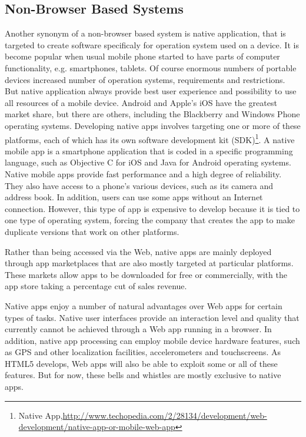 \subsection{Non-Browser Based Systems}
Another synonym of a non-browser based system is native application, that is targeted to create software specificaly for operation system used on a device. It is become popular when usual mobile phone started to have parts of computer functionality, e.g. smartphones, tablets. Of course enormous numbers of portable devices increased number of operation systems, requirements and restrictions. But native application always provide best user experience and possibility to use all resources of a mobile device. Android and Apple's iOS have the greatest market share, but there are others, including the Blackberry and Windows Phone operating systems. Developing native apps involves targeting one or more of these platforms, each of which has its own software development kit (SDK)\footnote{Native App,\url{http://www.techopedia.com/2/28134/development/web-development/native-app-or-mobile-web-app}}. A native mobile app is a smartphone application that is coded in a specific programming language, such as Objective C for iOS and Java for Android operating systems. Native mobile apps provide fast performance and a high degree of reliability. They also have access to a phone's various devices, such as its camera and address book. In addition, users can use some apps without an Internet connection. However, this type of app is expensive to develop because it is tied to one type of operating system, forcing the company that creates the app to make duplicate versions that work on other platforms.

Rather than being accessed via the Web, native apps are mainly deployed through app marketplaces that are also mostly targeted at particular platforms. These markets allow apps to be downloaded for free or commercially, with the app store taking a percentage cut of sales revenue.

Native apps enjoy a number of natural advantages over Web apps for certain types of tasks. Native user interfaces provide an interaction level and quality that currently cannot be achieved through a Web app running in a browser. In addition, native app processing can employ mobile device hardware features, such as GPS and other localization facilities, accelerometers and touchscreens. As HTML5 develops, Web apps will also be able to exploit some or all of these features. But for now, these bells and whistles are mostly exclusive to native apps.

